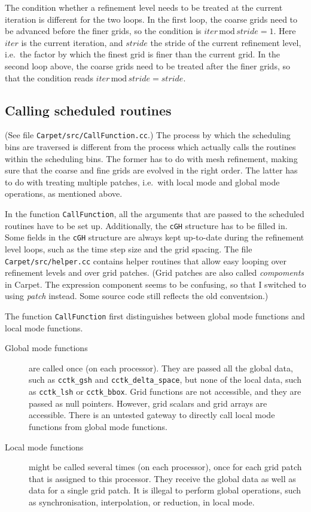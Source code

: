 \documentclass{article}
\begin{document}
   The condition whether a refinement level needs to be treated at the
   current iteration is different for the two loops.  In the first
   loop, the coarse grids need to be advanced before the finer grids,
   so the condition is $iter \,\mathrm{mod}\, stride = 1$.  Here
   $iter$ is the current iteration, and $stride$ the stride of the
   current refinement level, i.e.\ the factor by which the finest grid
   is finer than the current grid.  In the second loop above, the
   coarse grids need to be treated after the finer grids, so that the
   condition reads $iter \,\mathrm{mod}\, stride = stride$.



\subsection{Calling scheduled routines}

   (See file \texttt{Carpet/src/CallFunction.cc}.)  The process by
   which the scheduling bins are traversed is different from the
   process which actually calls the routines within the scheduling
   bins.  The former has to do with mesh refinement, making sure that
   the coarse and fine grids are evolved in the right order.  The
   latter has to do with treating multiple patches, i.e.\ with local
   mode and global mode operations, as mentioned above.

   In the function \texttt{CallFunction}, all the arguments that are
   passed to the scheduled routines have to be set up.  Additionally,
   the \texttt{cGH} structure has to be filled in.  Some fields in the
   \texttt{cGH} structure are always kept up-to-date during the
   refinement level loops, such as the time step size and the grid
   spacing.  The file \texttt{Carpet/src/helper.cc} contains helper
   routines that allow easy looping over refinement levels and over
   grid patches.  (Grid patches are also called \emph{compoments} in
   Carpet.  The expression component seems to be confusing, so that I
   switched to using \emph{patch} instead.  Some source code still
   reflects the old conventsion.)

   The function \texttt{CallFunction} first distinguishes between
   global mode functions and local mode functions.
\begin{description}
\item[Global mode functions]
   are called once (on each processor).  They are passed all the
   global data, such as \texttt{cctk\_gsh} and
   \texttt{cctk\_delta\_space}, but none of the local data, such as
   \texttt{cctk\_lsh} or \texttt{cctk\_bbox}.  Grid functions are not
   accessible, and they are passed as null pointers.  However, grid
   scalars and grid arrays are accessible.  There is an untested
   gateway to directly call local mode functions from global mode
   functions.
\item[Local mode functions]
   might be called several times (on each processor), once for each
   grid patch that is assigned to this processor.  They receive the
   global data as well as data for a single grid patch.  It is illegal
   to perform global operations, such as synchronisation,
   interpolation, or reduction, in local mode.
\end{description}
\end{document}
